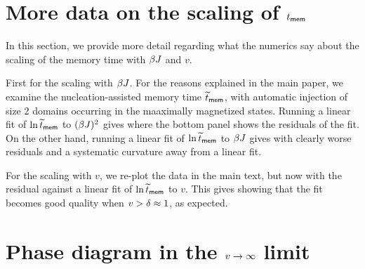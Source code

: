 \documentclass[12pt]{article}
\begin{document}
\section{More data on the scaling of $t_{\sf mem}$}

In this section, we provide more detail regarding what the numerics say about the scaling of the memory time with $\beta J$ and $v$. 

First for the scaling with $\beta J$. For the reasons explained in the main paper, we examine the nucleation-assisted memory time $\widetilde t_{\sf mem}$, with automatic injection of size 2 domains occurring in the maaximally magnetized states. 
Running a linear fit of $\ln \widetilde t_{\sf mem}$ to $(\beta J)^2$ gives
\be {} \ee 
where the bottom panel shows the residuals of the fit. On the other hand, running a linear fit of $\ln \widetilde t_{\sf mem}$ to $\beta J$ gives 
\be {} \ee 
with clearly worse residuals and a systematic curvature away from a linear fit. 

For the scaling with $v$, we re-plot the data in the main text, but now with the residual against a linear fit of $\ln \widetilde t_{\sf mem}$ to $v$. This gives 
\be {} \ee 
showing that the fit becomes good quality when $v > \delta \approx 1$, as expected. 


\section{Phase diagram in the $v\rightarrow \infty$ limit}
\end{document}
